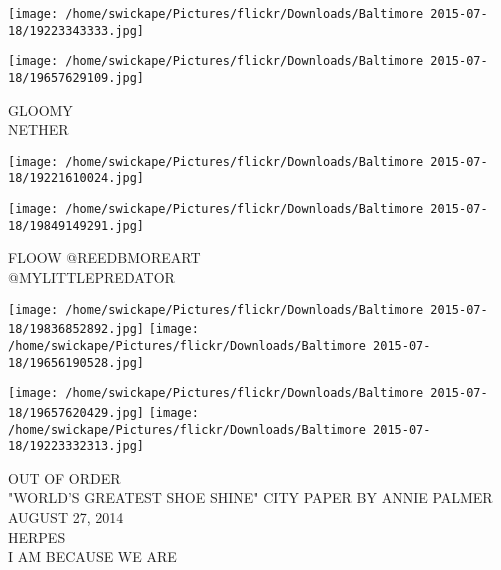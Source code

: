 \documentclass[10pt,letterpaper]{article}
\begin{document}
\texttt{[image: /home/swickape/Pictures/flickr/Downloads/Baltimore 2015-07-18/19223343333.jpg]}

\vspace{0.25in}
\texttt{[image: /home/swickape/Pictures/flickr/Downloads/Baltimore 2015-07-18/19657629109.jpg]}

GLOOMY\\
NETHER
\pagebreak

\texttt{[image: /home/swickape/Pictures/flickr/Downloads/Baltimore 2015-07-18/19221610024.jpg]}

\vspace{0.25in}
\texttt{[image: /home/swickape/Pictures/flickr/Downloads/Baltimore 2015-07-18/19849149291.jpg]}

FLOOW @REEDBMOREART\\
@MYLITTLEPREDATOR
\pagebreak

\texttt{[image: /home/swickape/Pictures/flickr/Downloads/Baltimore 2015-07-18/19836852892.jpg]}
\texttt{[image: /home/swickape/Pictures/flickr/Downloads/Baltimore 2015-07-18/19656190528.jpg]}

\texttt{[image: /home/swickape/Pictures/flickr/Downloads/Baltimore 2015-07-18/19657620429.jpg]}
\texttt{[image: /home/swickape/Pictures/flickr/Downloads/Baltimore 2015-07-18/19223332313.jpg]}

OUT OF ORDER\\
"WORLD'S GREATEST SHOE SHINE" CITY PAPER BY ANNIE PALMER AUGUST 27, 2014\\
HERPES\\
I AM BECAUSE WE ARE
\pagebreak
\end{document}
